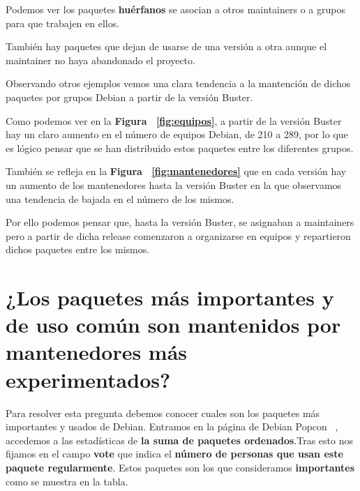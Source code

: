 \documentclass[a4paper, 12pt]{book}
\begin{document}
Podemos ver los paquetes \textbf{huérfanos} se asocian a otros maintainers o a grupos para que trabajen en ellos. 

También hay paquetes que dejan de usarse de una versión a otra aunque el maintainer no haya abandonado el proyecto.

Observando otros ejemplos vemos una clara tendencia a la mantención de dichos paquetes por grupos Debian a partir de la versión Buster.

Como podemos ver en la \textbf{Figura ~\ref{fig:equipos}}, a partir de la versión Buster hay un claro aumento en el número de equipos Debian, de 210 a 289, por lo que es lógico pensar que se han distribuido estos paquetes entre los diferentes grupos.

También se refleja en la \textbf{Figura ~\ref{fig:mantenedores}} que en cada versión hay un aumento de los mantenedores hasta la versión Buster en la que observamos una tendencia de bajada en el número de los mismos.

Por ello podemos pensar que, hasta la versión Buster, se asignaban a maintainers pero a partir de dicha release comenzaron a organizarse en equipos y repartieron dichos paquetes entre los mismos.


\section{¿Los paquetes más importantes y de uso común son mantenidos por mantenedores más experimentados?}
\label{sec:pregunta_6}

Para resolver esta pregunta debemos conocer cuales son los paquetes más importantes y usados de Debian. Entramos en la página de Debian Popcon ~\cite{debian:_popcon}, accedemos a las estadísticas de \textbf{la suma de paquetes ordenados}.Tras esto nos fijamos en el campo \textbf{vote} que indica el \textbf{número de personas que usan este paquete regularmente}. Estos paquetes son los que consideramos \textbf{importantes} como se muestra en la tabla.
\end{document}
